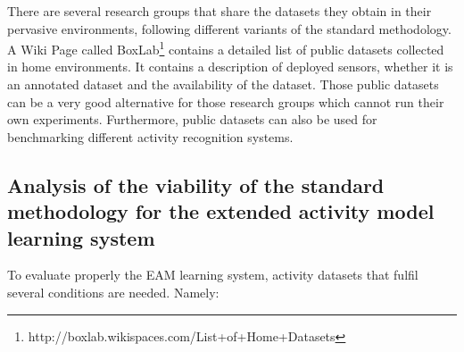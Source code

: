 There are several research groups that share the datasets they obtain in their pervasive environments, following different variants of the standard methodology. A Wiki Page called BoxLab\footnote{http://boxlab.wikispaces.com/List+of+Home+Datasets} contains a detailed list of public datasets collected in home environments. It contains a description of deployed sensors, whether it is an annotated dataset and the availability of the dataset. Those public datasets can be a very good alternative for those research groups which cannot run their own experiments. Furthermore, public datasets can also be used for benchmarking different activity recognition systems.



\subsection{Analysis of the viability of the standard methodology for the extended activity model learning system}

To evaluate properly the EAM learning system, activity datasets that fulfil several conditions are needed. Namely:

